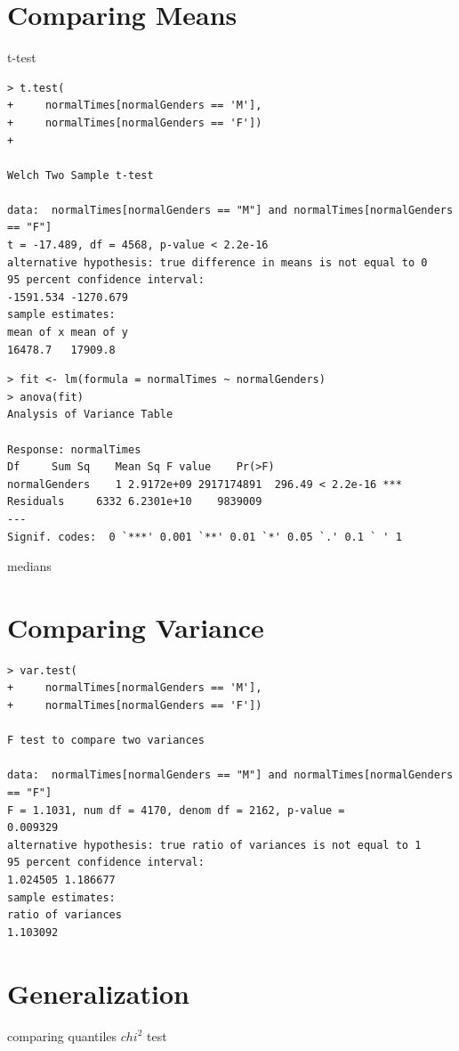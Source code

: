 \documentclass{tufte-book} %
\begin{document}
\section{Comparing Means}
t-test
\begin{Verbatim}
> t.test(
+     normalTimes[normalGenders == 'M'], 
+     normalTimes[normalGenders == 'F'])
+ 

Welch Two Sample t-test

data:  normalTimes[normalGenders == "M"] and normalTimes[normalGenders == "F"]
t = -17.489, df = 4568, p-value < 2.2e-16
alternative hypothesis: true difference in means is not equal to 0
95 percent confidence interval:
-1591.534 -1270.679
sample estimates:
mean of x mean of y 
16478.7   17909.8 
\end{Verbatim}

\begin{Verbatim}
> fit <- lm(formula = normalTimes ~ normalGenders)
> anova(fit)
Analysis of Variance Table

Response: normalTimes
Df     Sum Sq    Mean Sq F value    Pr(>F)    
normalGenders    1 2.9172e+09 2917174891  296.49 < 2.2e-16 ***
Residuals     6332 6.2301e+10    9839009                      
---
Signif. codes:  0 `***' 0.001 `**' 0.01 `*' 0.05 `.' 0.1 ` ' 1
\end{Verbatim}

medians


\section{Comparing Variance}
\begin{Verbatim}
> var.test(
+     normalTimes[normalGenders == 'M'], 
+     normalTimes[normalGenders == 'F'])

F test to compare two variances

data:  normalTimes[normalGenders == "M"] and normalTimes[normalGenders == "F"]
F = 1.1031, num df = 4170, denom df = 2162, p-value =
0.009329
alternative hypothesis: true ratio of variances is not equal to 1
95 percent confidence interval:
1.024505 1.186677
sample estimates:
ratio of variances 
1.103092 
\end{Verbatim}

\section{Generalization}
comparing quantiles
$chi^2$ test


\backmatter




\printindex %
\end{document}

